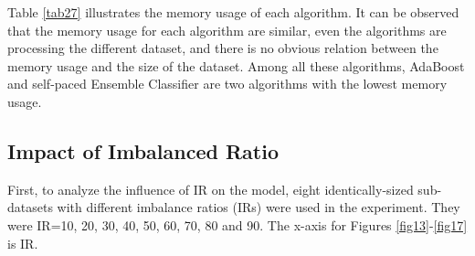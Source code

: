 Table \ref{tab27} illustrates the memory usage of each algorithm. It can be observed that the memory usage for each algorithm are similar, even the algorithms are processing the different dataset, and there is no obvious relation between the memory usage and the size of the dataset. Among all these algorithms, AdaBoost and self-paced Ensemble Classifier are two algorithms with the lowest memory usage.

\subsection{Impact of Imbalanced Ratio}
First, to analyze the influence of IR on the model, eight identically-sized sub-datasets with different imbalance ratios (IRs) were used in the experiment. They were IR=10, 20, 30, 40, 50, 60, 70, 80 and 90. The x-axis for Figures \ref{fig13}-\ref{fig17} is IR.
